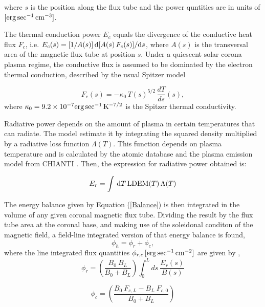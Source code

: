 \documentclass[namedreferences]{solarphysics}
\newcommand{\LDEM}{{\rm LDEM}}
\begin{document}
\begin{article}
\noindent
where $s$ is the position along {the flux tube} and the {power quntities} are in units of $[{\rm erg\,sec^{-1}\,cm^{-3}}]$.

{The thermal conduction power $E_c$ equals the divergence of the conductive heat flux $F_c$, i.e. $E_c(s)=[1/A(s)]\,{\rm d}[A(s)\,F_c(s)]/{\rm d}s$, where $A(s)$ is the transversal area of the magnetic flux tube at position $s$. Under a quiescent solar corona plasma regime, the conductive flux is assumed to be dominated by the electron thermal conduction, described by the usual Spitzer model \citep{spitzer_1962}

\begin{equation}\label{Fc}
F_c(s)=-\kappa_0\,{T(s)}^{5/2}\,\frac{dT}{ds}(s),
\end{equation}
where $\kappa_0 = 9.2 \times 10^{-7}  {\rm erg\,sec^{-1}\,K^{-7/2}}$ is the Spitzer thermal conductivity.}

Radiative power depends on the amount of plasma in certain temperatures that can radiate. The model estimate it by integrating the squared density multiplied by a radiative loss function $\Lambda(T)$. This function depends on plasma temperature and is calculated by the atomic database and the plasma emission model from CHIANTI \citep{delzanna_2015}. Then, the expression for radiative power obtained is:

\begin{equation}\label{Er}
E_r = \int\,\textrm{d}T\,\LDEM(T)\,\Lambda(T)
\end{equation}

{The energy balance given by Equation (\ref{Balance}) is then integrated in the volume of any given coronal magnetic flux tube. Dividing the result by the flux tube area at the coronal base, and making use of the soleidonal conditon of the magnetic field, a field-line integrated version of that energy balance is found,
\begin{equation}\label{FluxBalance}
\phi_h = \phi_r + \phi_c,
\end{equation}
\noindent
where the line integrated flux quantities $\phi_{r,c}\,[\rm{erg\,sec^{-1}\,cm^{-2}}]$ are given by \citep{maccormack_2017},} \\


\begin{equation}\label{phi_r}
\phi_r = \left( \frac{B_0 \ B_L}{B_0 + B_L} \right) \int_{0}^{L} ds \ \frac{E_r(s)}{B(s)}
\end{equation}

\begin{equation}\label{phi_c}
\phi_c = \left( \frac{B_0 \ F_{c,L} - B_L \ F_{c,0}}{B_0 + B_L} \right) 
\end{equation}


\end{article}
\end{document}
